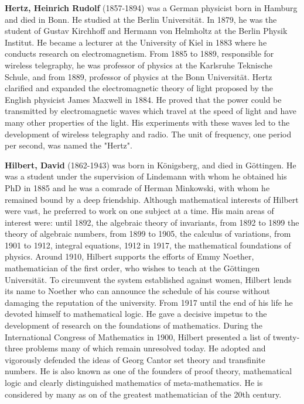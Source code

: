 \textbf{Hertz, Heinrich Rudolf} (1857-1894) was a German physicist born in Hamburg and died in Bonn. He studied at the Berlin Universität. In 1879, he was the student of Gustav Kirchhoff and Hermann von Helmholtz at the Berlin Physik Institut. He became a lecturer at the University of Kiel in 1883 where he conducts research on electromagnetism. From 1885 to 1889, responsible for wireless telegraphy, he was professor of physics at the Karlsruhe Teknische Schule, and from 1889, professor of physics at the Bonn Universität. Hertz clarified and expanded the electromagnetic theory of light proposed by the English physicist James Maxwell in 1884. He proved that the power could be transmitted by electromagnetic waves which travel at the speed of light and have many other properties of the light. His experiments with these waves led to the development of wireless telegraphy and radio. The unit of frequency, one period per second, was named the "Hertz".

\textbf{Hilbert, David} (1862-1943) was born in Königsberg, and died in Göttingen. He was a student under the supervision of Lindemann with whom he obtained his PhD in 1885 and he was a comrade of Herman Minkowski, with whom he remained bound by a deep friendship. Although mathematical interests of Hilbert were vast, he preferred to work on one subject at a time. His main areas of interest were: until 1892, the algebraic theory of invariants, from 1892 to 1899 the theory of algebraic numbers, from 1899 to 1905, the calculus of variations, from 1901 to 1912, integral equations, 1912 in 1917, the mathematical foundations of physics. Around 1910, Hilbert supports the efforts of Emmy Noether, mathematician of the first order, who wishes to teach at the Göttingen Universität. To circumvent the system established against women, Hilbert lends its name to Noether who can announce the schedule of his course without damaging the reputation of the university. From 1917 until the end of his life he devoted himself to mathematical logic. He gave a decisive impetus to the development of research on the foundations of mathematics. During the International Congress of Mathematics in 1900, Hilbert presented a list of twenty-three problems many of which remain unresolved today. He adopted and vigorously defended the ideas of Georg Cantor set theory and transfinite numbers. He is also known as one of the founders of proof theory, mathematical logic and clearly distinguished mathematics of meta-mathematics. He is considered by many as on of the greatest mathematician of the 20th century.

